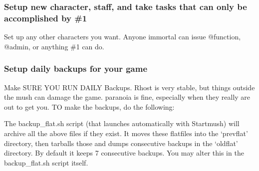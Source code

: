 \documentclass[letterpaper,10pt,english]{sphinxmanual}
\begin{document}
\subsubsection{Setup new character, staff, and take tasks that can only be accomplished by \#1}
\label{\detokenize{installation:setup-new-character-staff-and-take-tasks-that-can-only-be-accomplished-by-1}}
\sphinxAtStartPar
Set up any other characters you want.  Anyone immortal can issue @function, @admin, or anything \#1 can do.


\subsubsection{Setup daily backups for your game}
\label{\detokenize{installation:setup-daily-backups-for-your-game}}
\sphinxAtStartPar
Make SURE YOU RUN DAILY Backups.  Rhost is very stable, but things outside the mush can damage the game. paranoia is fine, especially when they really are out to get you.  TO make the backups, do the following:

\begin{sphinxVerbatim}[commandchars=\\\{\}]
                      
                    
                 
               
\end{sphinxVerbatim}

\sphinxAtStartPar
The backup\_flat.sh script (that launches automatically with Startmush) will archive all the above files if they exist.  It moves these flatfiles into the ‘prevflat’ directory, then tarballs those and dumps consecutive backups in the ‘oldflat’ directory.  By default it keeps 7 consecutive backups.  You may alter this in the backup\_flat.sh script itself.
\end{document}
